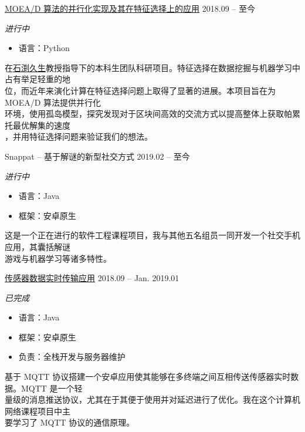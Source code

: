 \documentclass[hidelinks__VERSION__]{adamyi-cv}
\begin{document}
\begin{entrylist}


\entry
{\href{https://github.com/hackroid/pMOEA-D}{\heir MOEA/D 算法的并行化实现及其在特征选择上的应用}}
{2018.09 -- \hei 至今}
{\emph{\hei 进行中}
\begin{itemize}
    \item \hei 语言：Python
\end{itemize}
{\hei 在\href{http://cse.sustc.edu.cn/en/people/view/people_id/55/sort_id/9/pid/}{\hei 石渕久生}教授指导下的本科生团队科研项目。特征选择在数据挖掘与机器学习中占有举足轻重的地\\位，而近年来演化计算在特征选择问题上取得了显著的进展。本项目旨在为 MOEA/D 算法提供并行化\\环境，使用孤岛模型，探究发现对于区块间高效的交流方式以提高整体上获取帕累托最优解集的速度\\，并用特征选择问题来验证我们的想法。
}}


\entry
{\heir Snappat -- 基于解谜的新型社交方式}
{2019.02 -- \hei 至今}
{\emph{\hei 进行中}
\begin{itemize}
    \item \hei 语言：Java
    \item \hei 框架：安卓原生
\end{itemize}
{\hei 这是一个正在进行的软件工程课程项目，我与其他五名组员一同开发一个社交手机应用，其囊括解谜\\游戏与机器学习等诸多特性。
}}


\entry
{\href{https://github.com/hackroid/MqttSensorDemo}{\heir 传感器数据实时传输应用}}
{2018.09 -- Jan. 2019.01}
{\emph{\hei 已完成}
\begin{itemize}
    \item \hei 语言：Java
    \item \hei 框架：安卓原生
    \item \hei 负责：全栈开发与服务器维护
\end{itemize}
{\hei 基于 MQTT 协议搭建一个安卓应用使其能够在多终端之间互相传送传感器实时数据。MQTT 是一个轻\\量级的消息推送协议，尤其在于其便于使用并对延迟进行了优化。我在这个计算机网络课程项目中主\\要学习了 MQTT 协议的通信原理。
}}


\end{entrylist}
\end{document}
